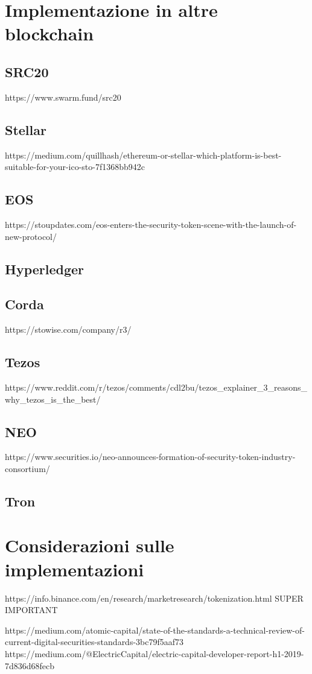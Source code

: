\section{Implementazione in altre blockchain}
\subsection{SRC20}
https://www.swarm.fund/src20
\subsection{Stellar}
https://medium.com/quillhash/ethereum-or-stellar-which-platform-is-best-suitable-for-your-ico-sto-7f1368bb942c
\subsection{EOS}
https://stoupdates.com/eos-enters-the-security-token-scene-with-the-launch-of-new-protocol/
\subsection{Hyperledger}
\subsection{Corda}
https://stowise.com/company/r3/
\subsection{Tezos}
https://www.reddit.com/r/tezos/comments/cdl2bu/tezos_explainer_3_reasons_why_tezos_is_the_best/
\subsection{NEO}
https://www.securities.io/neo-announces-formation-of-security-token-industry-consortium/
\subsection{Tron}
\section{Considerazioni sulle implementazioni}

https://info.binance.com/en/research/marketresearch/tokenization.html SUPER IMPORTANT

https://medium.com/atomic-capital/state-of-the-standards-a-technical-review-of-current-digital-securities-standards-3bc79f5aaf73
https://medium.com/@ElectricCapital/electric-capital-developer-report-h1-2019-7d836d68fecb